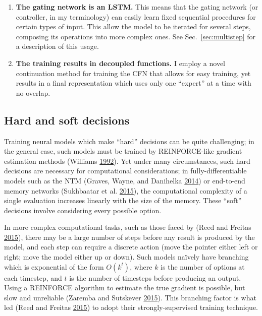 \documentclass[12pt,twoside]{mitthesis}
\providecommand{\tightlist}{%
  \setlength{\itemsep}{0pt}\setlength{\parskip}{0pt}}
\begin{document}
\begin{enumerate}
\def\labelenumi{\arabic{enumi}.}
\tightlist
\item
  \textbf{The gating network is an LSTM.} This means that the gating
  network (or controller, in my terminology) can easily learn fixed
  sequential procedures for certain types of input. This allow the model
  to be iterated for several steps, composing its operations into more
  complex ones. See Sec.~\ref{sec:multistep} for a description of this
  usage.
\item
  \textbf{The training results in decoupled functions.} I employ a novel
  continuation method for training the CFN that allows for easy
  training, yet results in a final representation which uses only one
  ``expert'' at a time with no overlap.
\end{enumerate}

\subsection{Hard and soft decisions}\label{hard-and-soft-decisions}

Training neural models which make ``hard'' decisions can be quite
challenging; in the general case, such models must be trained by
REINFORCE-like gradient estimation methods (Williams
\protect\hyperlink{ref-williams1992simple}{1992}). Yet under many
circumstances, such hard decisions are necessary for computational
considerations; in fully-differentiable models such as the NTM (Graves,
Wayne, and Danihelka \protect\hyperlink{ref-graves2014neural}{2014}) or
end-to-end memory networks (Sukhbaatar et al.
\protect\hyperlink{ref-sukhbaatar2015end}{2015}), the computational
complexity of a single evaluation increases linearly with the size of
the memory. These ``soft'' decisions involve considering every possible
option.

In more complex computational tasks, such as those faced by (Reed and
Freitas \protect\hyperlink{ref-reed2015neural}{2015}), there may be a
large number of steps before any result is produced by the model, and
each step can require a discrete action (move the pointer either left or
right; move the model either up or down). Such models naïvely have
branching which is exponential of the form $O(k^t)$, where $k$ is
the number of options at each timestep, and $t$ is the number of
timesteps before producing an output. Using a REINFORCE algorithm to
estimate the true gradient is possible, but slow and unreliable (Zaremba
and Sutskever \protect\hyperlink{ref-zaremba2015reinforcement}{2015}).
This branching factor is what led (Reed and Freitas
\protect\hyperlink{ref-reed2015neural}{2015}) to adopt their
strongly-supervised training technique.
\end{document}
